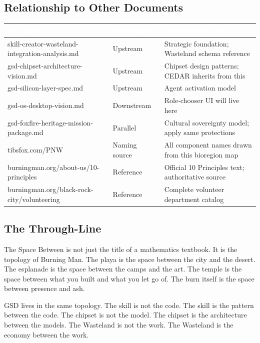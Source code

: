 \documentclass[11pt,letterpaper]{article}
\newcommand{\tableheader}[1]{\textbf{\sffamily\textcolor{white}{#1}}}
\begin{document}
\subsection{Relationship to Other Documents}

\begin{center}
\begin{tabularx}{\textwidth}{L{4.5cm}L{2.5cm}X}
\toprule
{}
\tableheader{Document} & \tableheader{Relationship} & \tableheader{Dependency Type} \\
\midrule
skill-creator-wasteland-integration-analysis.md & Upstream & Strategic foundation; Wasteland schema reference \\
gsd-chipset-architecture-vision.md & Upstream & Chipset design patterns; CEDAR inherits from this \\
gsd-silicon-layer-spec.md & Upstream & Agent activation model \\
gsd-os-desktop-vision.md & Downstream & Role-chooser UI will live here \\
gsd-foxfire-heritage-mission-package.md & Parallel & Cultural sovereignty model; apply same protections \\
tibsfox.com/PNW & Naming source & All component names drawn from this bioregion map \\
burningman.org/about-us/10-principles & Reference & Official 10 Principles text; authoritative source \\
burningman.org/black-rock-city/volunteering & Reference & Complete volunteer department catalog \\
\bottomrule
\end{tabularx}
\end{center}

\subsection{The Through-Line}

The Space Between is not just the title of a mathematics textbook. It is the topology of Burning Man. The playa is the space between the city and the desert. The esplanade is the space between the camps and the art. The temple is the space between what you built and what you let go of. The burn itself is the space between presence and ash.

GSD lives in the same topology. The skill is not the code. The skill is the pattern between the code. The chipset is not the model. The chipset is the architecture between the models. The Wasteland is not the work. The Wasteland is the economy between the work.
\end{document}

